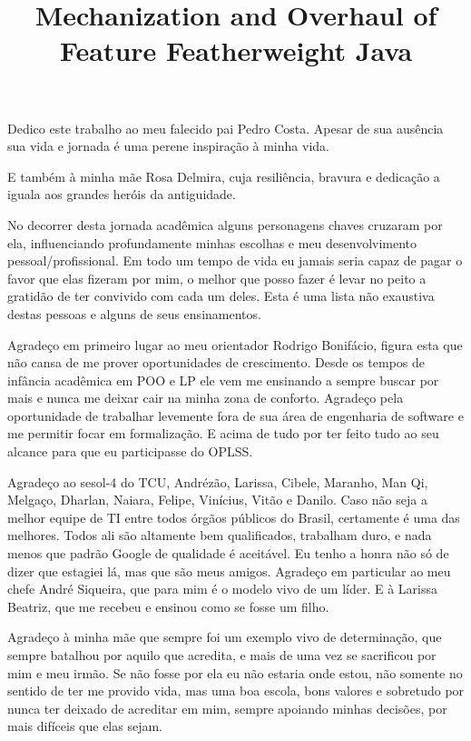 \documentclass[bacharelado]{unb-cic}
\title{Mechanization and Overhaul of Feature Featherweight Java}
\theoremstyle{definition}
\theoremstyle{definition}
\begin{document}
  \maketitle
  \pretextual

  \begin{dedicatoria}
      Dedico este trabalho ao meu falecido pai Pedro Costa.
      Apesar de sua ausência sua vida e jornada é uma perene inspiração
      à minha vida.

      E também à minha mãe Rosa Delmira, cuja resiliência,
      bravura e dedicação a iguala aos grandes heróis da antiguidade.
  \end{dedicatoria}

  \begin{agradecimentos}
    No decorrer desta jornada acadêmica alguns personagens chaves cruzaram por ela,
    influenciando profundamente minhas escolhas e meu desenvolvimento pessoal/profissional. Em todo um tempo de vida eu jamais seria capaz de pagar o favor
    que elas fizeram por mim, o melhor que posso fazer é levar no peito a gratidão
    de ter convivido com cada um deles. Esta é uma lista não exaustiva destas pessoas e alguns de seus ensinamentos.

    Agradeço em primeiro lugar ao meu orientador Rodrigo Bonifácio, figura esta que 
    não cansa de me prover oportunidades de crescimento. Desde os tempos de infância
    acadêmica em POO e LP ele vem me ensinando a sempre buscar por mais e nunca 
    me deixar cair na minha zona de conforto. Agradeço pela oportunidade de trabalhar
    levemente fora de sua área de engenharia de software e me permitir focar em formalização. E acima de tudo por ter feito tudo ao seu alcance para que eu participasse do OPLSS.

    Agradeço ao sesol-4 do TCU, Andrézão, Larissa, Cibele, Maranho, Man Qi, Melgaço,
    Dharlan, Naiara, Felipe, Vinícius, Vitão e Danilo.
    Caso não seja a melhor equipe de TI entre todos órgãos públicos do Brasil,
    certamente é uma das melhores. Todos ali são altamente bem qualificados,
    trabalham duro, e nada menos que padrão Google de qualidade é aceitável.
    Eu tenho a honra não só de dizer que estagiei lá, mas que são meus amigos.
    Agradeço em particular ao meu chefe André Siqueira, que para mim é o modelo vivo de um líder.
    E à Larissa Beatriz, que me recebeu e ensinou como se fosse um filho.

    Agradeço à minha mãe que sempre foi um exemplo vivo de determinação,
    que sempre batalhou por aquilo que acredita, e mais de uma vez se sacrificou
    por mim e meu irmão. Se não fosse por ela eu não estaria onde estou, não somente
    no sentido de ter me provido vida, mas uma boa escola, bons valores e sobretudo
    por nunca ter deixado de acreditar em mim, sempre apoiando minhas decisões, por
    mais difíceis que elas sejam.


\end{agradecimentos}
\end{document}
